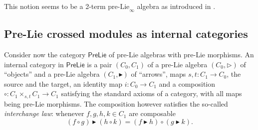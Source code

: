 \documentclass[noamsfonts, reqno]{amsart}
\newcommand{\catpl}{\mathsf{PreLie}}
\newcommand{\prelie}{\mathbin{\vartriangleright}}
\newcommand{\preliealt}{\mathbin{\blacktriangleright}}
\begin{document}
\begin{remark}
  This notion seems to be a 2-term \(\text{pre-Lie}_\infty\) algebra as introduced in \cite{CL2001}.
\end{remark}
\subsection{Pre-Lie crossed modules as internal categories}
Consider now the category \(\catpl\) of pre-Lie algebras with pre-Lie morphisms.
An internal category in \(\catpl\) is a pair \((C_0, C_1)\) of a pre-Lie algebra \((C_0,\prelie)\) of ``objects'' and a pre-Lie algebra \((C_1,\preliealt)\) of ``arrows'', maps \(s,t\colon C_1\to C_0\), the source and the target, an identity map \(i\colon C_0\to C_1\) and a composition \(\circ\colon C_1\times_{s,t} C_1\to C_1\) satisfying the standard axioms of a category, with all maps being pre-Lie morphisms.
The composition however satisfies the so-called \emph{interchange law}: whenever \(f,g,h,k\in C_1\) are composable
\[
  (f\circ g)\preliealt(h\circ k) = (f\preliealt h)\circ(g\preliealt k).
\]
\end{document}
